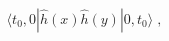 \begin{equation}
\langle  t_0,0| 
 \hat{h}(x)\hat{h}(y)|0, t_0 \rangle \; ,
\label{exv}
\end{equation}

